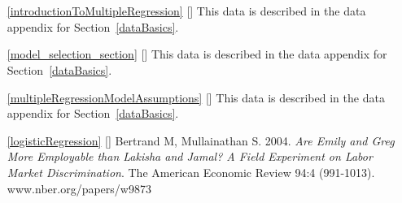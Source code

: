 \section{}
\label{ch_regr_mult_and_log_data}

\begin{itemize}
\item[\ref{introductionToMultipleRegression}]
    [\datalink{loans\_full\_schema}]
    This data is described in the data appendix for
    Section~\ref{dataBasics}.

\item[\ref{model_selection_section}]
    [\datalink{loans\_full\_schema}]
    This data is described in the data appendix for
    Section~\ref{dataBasics}.

\item[\ref{multipleRegressionModelAssumptions}]
    [\datalink{loans\_full\_schema}]
    This data is described in the data appendix for
    Section~\ref{dataBasics}.

\item[\ref{logisticRegression}]
    [\datalink{resume}]
    Bertrand M, Mullainathan S. 2004.
    \emph{Are Emily and Greg More Employable than Lakisha and Jamal?
    A Field Experiment on Labor Market Discrimination}.
    The American Economic Review 94:4 (991-1013).
        {www.nber.org/papers/w9873}

\end{itemize}

